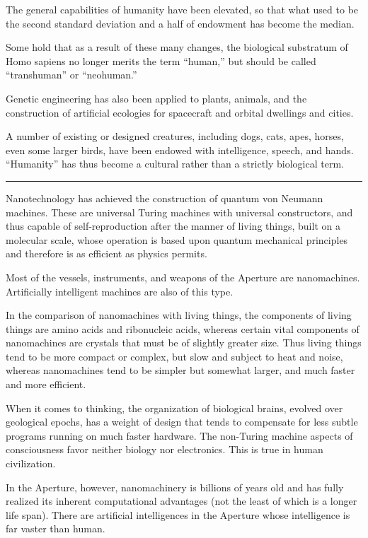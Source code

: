 \documentclass[english,11pt,letterpaper,onecolumn]{scrbook}
\begin{document}
	The general capabilities of humanity have been elevated, so that what used to be the second standard deviation and a half of endowment has become the median.

	Some hold that as a result of these many changes, the biological substratum of Homo sapiens no longer merits the term ``human,'' but should be called ``transhuman'' or ``neohuman.''

	Genetic engineering has also been applied to plants, animals, and the construction of artificial ecologies for spacecraft and orbital dwellings and cities.

	A number of existing or designed creatures, including dogs, cats, apes, horses, even some larger birds, have been endowed with intelligence, speech, and hands.  ``Humanity'' has thus become a cultural rather than a strictly biological term.

\begin{center}\rule[3pt]{2in}{0.5pt}\end{center}

	Nanotechnology has achieved the construction of quantum von Neumann machines.  These are universal Turing machines with universal constructors, and thus capable of self-reproduction after the manner of living things, built on a molecular scale, whose operation is based upon quantum mechanical principles and therefore is as efficient as physics permits.

	Most of the vessels, instruments, and weapons of the Aperture are nanomachines.  Artificially intelligent machines are also of this type.

	In the comparison of nanomachines with living things, the components of living things are amino acids and ribonucleic acids, whereas certain vital components of nanomachines are crystals that must be of slightly greater size.  Thus living things tend to be more compact or complex, but slow and subject to heat and noise, whereas nanomachines tend to be simpler but somewhat larger, and much faster and more efficient.  

	When it comes to thinking, the organization of biological brains, evolved over geological epochs, has a weight of design that tends to compensate for less subtle programs running on much faster hardware.  The non-Turing machine aspects of consciousness favor neither biology nor electronics.  This is true in human civilization.  

	In the Aperture, however, nanomachinery is billions of years old and has fully realized its inherent computational advantages (not the least of which is a longer life span).  There are artificial intelligences in the Aperture whose intelligence is far vaster than human.
\end{document}
